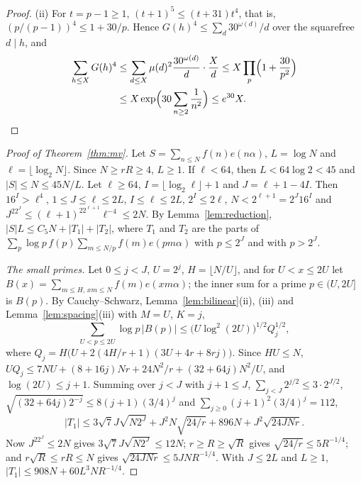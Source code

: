 \documentclass[12pt]{amsart}
\theoremstyle{remark}
\begin{document}
\begin{proof}
(ii) For $t=p-1\ge1$, $(t+1)^5\le(t+31)t^4$, that is, $(p/(p-1))^4\le1+30/p$. Hence
$G(h)^4\le\sum_d30^{\omega(d)}/d$ over the squarefree $d\mid h$, and
\begin{align*}
  \sum_{h\le X}G(h)^4&\le\sum_{d\le X}\mu(d)^2\frac{30^{\omega(d)}}d\cdot\frac Xd
  \le X\prod_p\Bigl(1+\frac{30}{p^2}\Bigr)\\
  &\le X\exp\Bigl(30\sum_{n\ge2}\frac1{n^2}\Bigr)\le e^{30}X.\qedhere
\end{align*}
\end{proof}

\begin{proof}[Proof of Theorem~\ref{thm:mv}]
Let $S=\sum_{n\le N}f(n)e(n\alpha)$, $L=\log N$ and $\ell=\lfloor\log_2N\rfloor$. Since $N\ge rR\ge4$,
$L\ge1$. If $\ell<64$, then $L<64\log2<45$ and $|S|\le N\le45N/L$. Let $\ell\ge64$,
$I=\lfloor\log_2\ell\rfloor+1$ and $J=\ell+1-4I$. Then $16^I>\ell^4$, $1\le J\le\ell\le2L$,
$I\le\ell\le2L$, $2^I\le2\ell$, $N<2^{\ell+1}=2^J16^I$ and
$J^22^J\le(\ell+1)^22^{\ell+1}\ell^{-4}\le2N$. By Lemma~\ref{lem:reduction},
$|S|L\le C_5N+|T_1|+|T_2|$, where $T_1$ and $T_2$ are the parts of
$\sum_p\log p\,f(p)\sum_{m\le N/p}f(m)e(pm\alpha)$ with $p\le2^J$ and with $p>2^J$.

\emph{The small primes.} Let $0\le j<J$, $U=2^j$, $H=\lfloor N/U\rfloor$, and for $U<x\le2U$ let
$B(x)=\sum_{m\le H,\,xm\le N}f(m)e(xm\alpha)$; the inner sum for a prime $p\in(U,2U]$ is $B(p)$.
By Cauchy--Schwarz, Lemma~\ref{lem:bilinear}(ii), (iii) and Lemma~\ref{lem:spacing}(iii) with
$M=U$, $K=j$,
\[
  \sum_{U<p\le2U}\log p\,|B(p)|\le\bigl(U\log^2(2U)\bigr)^{1/2}Q_j^{1/2},
\]
where $Q_j=H\bigl(U+2(4H/r+1)(3U+4r+8rj)\bigr)$.
Since $HU\le N$, $UQ_j\le7NU+(8+16j)Nr+24N^2/r+(32+64j)N^2/U$, and $\log(2U)\le j+1$. Summing over
$j<J$ with $j+1\le J$, $\sum_{j<J}2^{j/2}\le3\cdot2^{J/2}$,
$\sqrt{(32+64j)2^{-j}}\le8(j+1)(3/4)^j$ and $\sum_{j\ge0}(j+1)^2(3/4)^j=112$,
\[
  |T_1|\le3\sqrt7J\sqrt{N2^J}+J^2N\sqrt{24/r}+896N+J^2\sqrt{24JNr}.
\]
Now $J^22^J\le2N$ gives $3\sqrt7J\sqrt{N2^J}\le12N$; $r\ge R\ge\sqrt R$ gives
$\sqrt{24/r}\le5R^{-1/4}$; and $r\sqrt R\le rR\le N$ gives $\sqrt{24JNr}\le5JNR^{-1/4}$. With
$J\le2L$ and $L\ge1$, $|T_1|\le908N+60L^3NR^{-1/4}$.


\end{proof}
\end{document}
